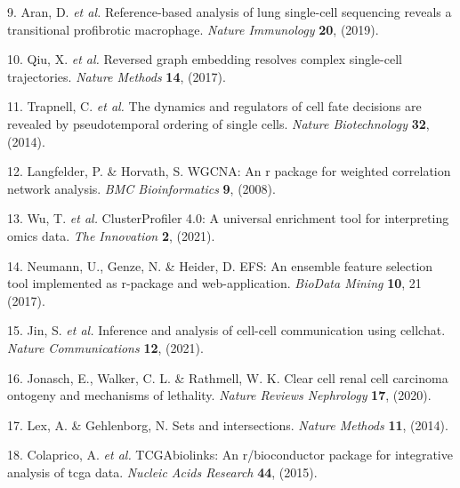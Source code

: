 \documentclass[
]{article}
\newenvironment{cslreferences}%
  {}%
  {\par}
\begin{document}
\begin{cslreferences}
\leavevmode\hypertarget{ref-ReferenceBasedAran2019}{}%
9. Aran, D. \emph{et al.} Reference-based analysis of lung single-cell sequencing reveals a transitional profibrotic macrophage. \emph{Nature Immunology} \textbf{20}, (2019).

\leavevmode\hypertarget{ref-ReversedGraphQiuX2017}{}%
10. Qiu, X. \emph{et al.} Reversed graph embedding resolves complex single-cell trajectories. \emph{Nature Methods} \textbf{14}, (2017).

\leavevmode\hypertarget{ref-TheDynamicsAnTrapne2014}{}%
11. Trapnell, C. \emph{et al.} The dynamics and regulators of cell fate decisions are revealed by pseudotemporal ordering of single cells. \emph{Nature Biotechnology} \textbf{32}, (2014).

\leavevmode\hypertarget{ref-WgcnaAnRPacLangfe2008}{}%
12. Langfelder, P. \& Horvath, S. WGCNA: An r package for weighted correlation network analysis. \emph{BMC Bioinformatics} \textbf{9}, (2008).

\leavevmode\hypertarget{ref-ClusterprofilerWuTi2021}{}%
13. Wu, T. \emph{et al.} ClusterProfiler 4.0: A universal enrichment tool for interpreting omics data. \emph{The Innovation} \textbf{2}, (2021).

\leavevmode\hypertarget{ref-EfsAnEnsemblNeuman2017}{}%
14. Neumann, U., Genze, N. \& Heider, D. EFS: An ensemble feature selection tool implemented as r-package and web-application. \emph{BioData Mining} \textbf{10}, 21 (2017).

\leavevmode\hypertarget{ref-InferenceAndAJinS2021}{}%
15. Jin, S. \emph{et al.} Inference and analysis of cell-cell communication using cellchat. \emph{Nature Communications} \textbf{12}, (2021).

\leavevmode\hypertarget{ref-ClearCellRenaJonasc2020}{}%
16. Jonasch, E., Walker, C. L. \& Rathmell, W. K. Clear cell renal cell carcinoma ontogeny and mechanisms of lethality. \emph{Nature Reviews Nephrology} \textbf{17}, (2020).

\leavevmode\hypertarget{ref-SetsAndIntersLexA2014}{}%
17. Lex, A. \& Gehlenborg, N. Sets and intersections. \emph{Nature Methods} \textbf{11}, (2014).

\leavevmode\hypertarget{ref-TcgabiolinksAColapr2015}{}%
18. Colaprico, A. \emph{et al.} TCGAbiolinks: An r/bioconductor package for integrative analysis of tcga data. \emph{Nucleic Acids Research} \textbf{44}, (2015).
\end{cslreferences}
\end{document}
